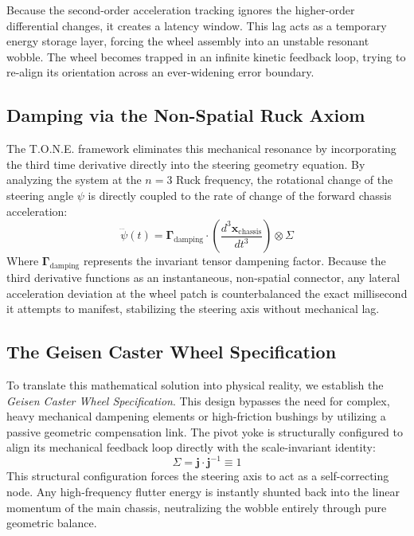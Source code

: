\documentclass[11pt,a4paper]{article}
\begin{document}
Because the second-order acceleration tracking ignores the higher-order differential changes, it creates a latency window. This lag acts as a temporary energy storage layer, forcing the wheel assembly into an unstable resonant wobble. The wheel becomes trapped in an infinite kinetic feedback loop, trying to re-align its orientation across an ever-widening error boundary.

\subsection{Damping via the Non-Spatial Ruck Axiom}
The T.O.N.E. framework eliminates this mechanical resonance by incorporating the third time derivative directly into the steering geometry equation. By analyzing the system at the $n=3$ Ruck frequency, the rotational change of the steering angle $\psi$ is directly coupled to the rate of change of the forward chassis acceleration:
\begin{equation}
    \dddot{\psi}(t) = \mathbf{\Gamma}_{\text{damping}} \cdot \left( \frac{d^3 \mathbf{x}_{\text{chassis}}}{dt^3} \right) \otimes \Sigma
\end{equation}
Where $\mathbf{\Gamma}_{\text{damping}}$ represents the invariant tensor dampening factor. Because the third derivative functions as an instantaneous, non-spatial connector, any lateral acceleration deviation at the wheel patch is counterbalanced the exact millisecond it attempts to manifest, stabilizing the steering axis without mechanical lag.

\subsection{The Geisen Caster Wheel Specification}
To translate this mathematical solution into physical reality, we establish the \textit{Geisen Caster Wheel Specification}. This design bypasses the need for complex, heavy mechanical dampening elements or high-friction bushings by utilizing a passive geometric compensation link. The pivot yoke is structurally configured to align its mechanical feedback loop directly with the scale-invariant identity:
\begin{equation}
    \Sigma = \mathbf{j} \cdot \mathbf{j}^{-1} \equiv 1
    \label{eq:geisen_spec}
\end{equation}
This structural configuration forces the steering axis to act as a self-correcting node. Any high-frequency flutter energy is instantly shunted back into the linear momentum of the main chassis, neutralizing the wobble entirely through pure geometric balance.
\end{document}

